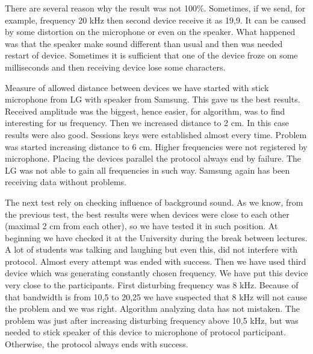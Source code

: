 \documentclass[11pt,titlepage]{article}
\theoremstyle{plain}
\begin{document}
\vspace{5mm}

There are several reason why the result was not 100\%. Sometimes, if we send, for example, frequency 20 kHz then second device receive it as 19,9. It can be caused by some distortion on the microphone or even on the speaker. What happened was that the speaker make sound different than usual and then was needed restart of device. Sometimes it is sufficient that one of the device froze on some milliseconds and then receiving device lose some characters. 

\vspace{5mm}

Measure of allowed distance between devices we have started with stick microphone from LG with speaker from Samsung. This gave us the best results. Received amplitude was the biggest, hence easier, for algorithm, was to find interesting for us frequency. Then we increased distance to 2 cm. In this case results were also good. Sessions keys were established almost every time. Problem was started increasing distance to 6 cm. Higher frequencies were not registered by microphone. Placing the devices parallel the protocol always end by failure. The LG was not able to gain all frequencies in such way. Samsung again has been receiving data without problems. 

\vspace{5mm}

The next test rely on checking influence of background sound. As we know, from the previous test, the best results were when devices were close to each other (maximal 2 cm from each other), so we have tested it in such position. At beginning we have checked it at the University during the break between lectures. A lot of students was talking and laughing but even this, did not interfere with protocol. Almost every attempt was ended with success. Then we have used third device which was generating constantly chosen frequency. We have put this device very close to the participants. First disturbing frequency was 8 kHz. Because of that bandwidth is from 10,5 to 20,25 we have suspected that 8 kHz will not cause the problem and we was right. Algorithm analyzing data has not mistaken. The problem was just after increasing disturbing frequency above 10,5 kHz, but was needed to stick speaker of this device to microphone of protocol participant. Otherwise, the protocol always ends with success. 

\vspace{5mm}
\end{document}
